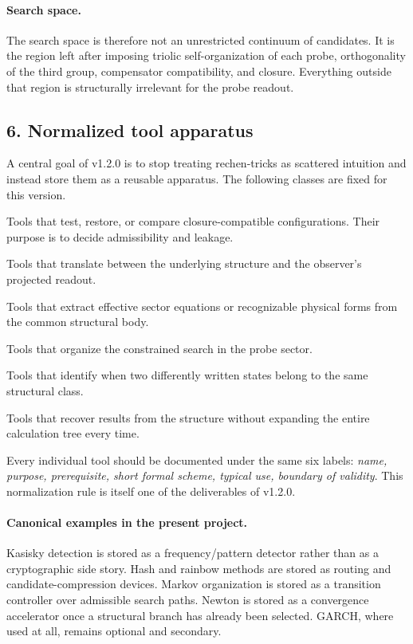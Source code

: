 \paragraph{Search space.}
The search space is therefore not an unrestricted continuum of candidates. It
is the region left after imposing triolic self-organization of each probe,
orthogonality of the third group, compensator compatibility, and closure.
Everything outside that region is structurally irrelevant for the probe readout.

\subsection*{6. Normalized tool apparatus}
A central goal of v1.2.0 is to stop treating rechen-tricks as scattered
intuition and instead store them as a reusable apparatus. The following classes
are fixed for this version.

\begin{description}[leftmargin=2.2em, style=nextline]
  \item[Closure-tools.] Tools that test, restore, or compare closure-compatible
  configurations. Their purpose is to decide admissibility and leakage.
  \item[Frame-shift-tools.] Tools that translate between the underlying
  structure and the observer's projected readout.
  \item[Projection-tools.] Tools that extract effective sector equations or
  recognizable physical forms from the common structural body.
  \item[Probe-tools.] Tools that organize the constrained search in the probe
  sector.
  \item[Equivalence-tools.] Tools that identify when two differently written
  states belong to the same structural class.
  \item[Read-off / trace-tools.] Tools that recover results from the structure
  without expanding the entire calculation tree every time.
\end{description}

Every individual tool should be documented under the same six labels:
\emph{name, purpose, prerequisite, short formal scheme, typical use, boundary
of validity}. This normalization rule is itself one of the deliverables of
v1.2.0.

\paragraph{Canonical examples in the present project.}
Kasisky detection is stored as a frequency/pattern detector rather than as a
cryptographic side story. Hash and rainbow methods are stored as routing and
candidate-compression devices. Markov organization is stored as a transition
controller over admissible search paths. Newton is stored as a convergence
accelerator once a structural branch has already been selected. GARCH, where
used at all, remains optional and secondary.

